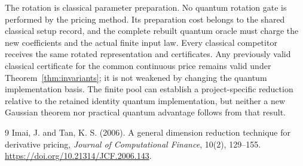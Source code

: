 \documentclass[11pt,a4paper]{article}
\begin{document}
The rotation is classical parameter preparation. No quantum rotation gate
is performed by the pricing method. Its preparation cost belongs to the
shared classical setup record, and the complete rebuilt quantum oracle
must charge the new coefficients and the actual finite input law.
Every classical competitor receives the same rotated representation and
certificates. Any previously valid classical certificate for the common
continuous price remains valid under Theorem~\ref{thm:invariants}; it is
not weakened by changing the quantum implementation basis. The finite
pool can establish a project-specific reduction relative to the retained
identity quantum implementation, but neither a new Gaussian theorem nor
practical quantum advantage follows from that result.
\begin{thebibliography}{9}
Imai, J. and Tan, K. S. (2006). A general dimension reduction technique for
derivative pricing, \textit{Journal of Computational Finance}, 10(2),
129--155. \url{https://doi.org/10.21314/JCF.2006.143}.
\end{thebibliography}
\end{document}
